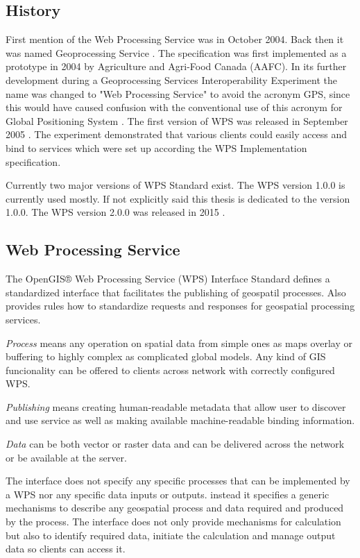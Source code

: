\documentclass[12pt,a4paper]{article}
\begin{document}
\subsection{History}
First mention of the Web Processing Service was in October 2004. Back then it
was named Geoprocessing Service \cite{OGC_news}. The specification was first 
implemented as a prototype in 2004 by Agriculture and Agri-Food Canada (AAFC).
In its further development during a Geoprocessing Services Interoperability Experiment \cite{WPS_experiment} 
the name was changed to "Web Processing Service" to avoid the acronym GPS, since 
this would have caused confusion with the conventional use of this acronym for 
Global Positioning System \cite{WPS_standart_1.0}. The first version of WPS was released in
September 2005 \cite{WPS_first}. The experiment demonstrated that various clients
could easily access and bind to services which were set up according the WPS Implementation
specification.

Currently two major versions of WPS Standard exist. The WPS version 1.0.0 is currently used mostly.
If not explicitly said this thesis is dedicated to the version 1.0.0. The WPS version 2.0.0 was
released in 2015 \cite{WPS_second}.

\bigskip
\subsection{Web Processing Service}
The OpenGIS® Web Processing Service (WPS) Interface Standard defines a standardized interface
that facilitates the publishing of geospatil processes. Also provides rules how to standardize
requests and responses for geospatial processing services. 

\textit{Process} means any operation on spatial
data from simple ones as maps overlay or buffering to highly complex as complicated global models. Any kind of GIS 
funcionality can be offered to clients across network with correctly configured WPS. 

\textit{Publishing} means
creating human-readable metadata that allow user to discover and use service as well as making 
available machine-readable binding information.

\textit{Data} can be both vector or raster data and can be delivered across the network or be available
at the server.

The interface does not specify any specific processes that can be implemented by a WPS nor any specific
data inputs or outputs. instead it specifies a generic mechanisms to describe any geospatial process and
data required and produced by the process. The interface does not only provide mechanisms for calculation
but also to identify required data, initiate the calculation and manage output data so clients can access it. 
\end{document}
